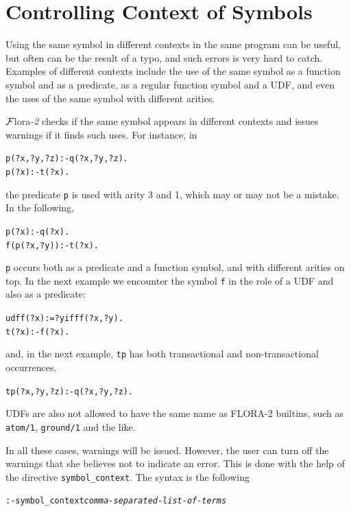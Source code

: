 \documentclass[11pt]{article}
\newcommand{\FLORA}{{\mbox{\sc ${\cal F}${lora}\rm\emph{-2}}}\xspace}
\begin{document}
\section{Controlling Context of Symbols} \label{sec:symbol}


Using the same symbol in different contexts in the same program can be
useful, but often can be the result of a typo, and such errors is very hard
to catch. Examples of different contexts include the use of the same symbol
as a function symbol and as a predicate, as a regular function symbol and a
UDF, and even the uses of the same symbol with different arities.

\FLORA checks if the same symbol appears in different contexts
and issues warnings if it finds such uses. For instance, in
\begin{alltt}
	p(?x,?y,?z):-q(?x,?y,?z).
	p(?x):-t(?x).
\end{alltt}
the predicate \texttt{p} is used with arity 3 and 1, which may or may not be a
mistake. In the following,
\begin{alltt}
	p(?x):-q(?x).
	f(p(?x,?y)):-t(?x).
\end{alltt}
\texttt{p} occurs both as a predicate and a function symbol, and with
different arities on top. In the next example we encounter the symbol
\texttt{f} in the role of a UDF and also as a predicate:  
\begin{alltt}
	udf f(?x):=?y if ff(?x,?y).
	t(?x):-f(?x).
\end{alltt}
and, in the next example, \texttt{tp} has both transactional and
non-transactional occurrences. 
\begin{alltt}
	tp(?x,?y,?z):-q(?x,?y,?z).
\end{alltt}
UDFs are also not allowed to have the same name as FLORA-2 builtins, such
as \texttt{atom/1}, \texttt{ground/1} and the like.  


In all these cases, warnings will be issued. However, the user can turn off
the warnings that she believes not to indicate an error. This is done with
the help of the directive
\texttt{symbol\_context}.  The syntax is the following
\begin{alltt}
:- symbol_context \textnormal{\emph{comma-separated-list-of-terms}}
\end{alltt}
\end{document}
